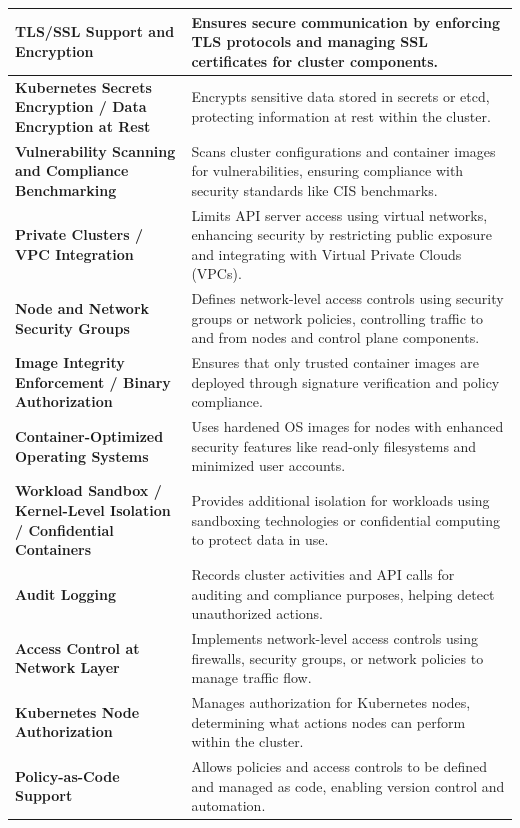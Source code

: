 \begin{longtable}{p{0.35\linewidth} p{0.65\linewidth}}
\hline
\textbf{TLS/SSL Support and Encryption} & Ensures secure communication by enforcing TLS protocols and managing SSL certificates for cluster components. \\
\hline
\textbf{Kubernetes Secrets Encryption / Data Encryption at Rest} & Encrypts sensitive data stored in secrets or etcd, protecting information at rest within the cluster. \\
\hline
\textbf{Vulnerability Scanning and Compliance Benchmarking} & Scans cluster configurations and container images for vulnerabilities, ensuring compliance with security standards like CIS benchmarks. \\
\hline
\textbf{Private Clusters / VPC Integration} & Limits API server access using virtual networks, enhancing security by restricting public exposure and integrating with Virtual Private Clouds (VPCs). \\
\hline
\textbf{Node and Network Security Groups} & Defines network-level access controls using security groups or network policies, controlling traffic to and from nodes and control plane components. \\
\hline
\textbf{Image Integrity Enforcement / Binary Authorization} & Ensures that only trusted container images are deployed through signature verification and policy compliance. \\
\hline
\textbf{Container-Optimized Operating Systems} & Uses hardened OS images for nodes with enhanced security features like read-only filesystems and minimized user accounts. \\
\hline
\textbf{Workload Sandbox / Kernel-Level Isolation / Confidential Containers} & Provides additional isolation for workloads using sandboxing technologies or confidential computing to protect data in use. \\
\hline
\textbf{Audit Logging} & Records cluster activities and API calls for auditing and compliance purposes, helping detect unauthorized actions. \\
\hline
\textbf{Access Control at Network Layer} & Implements network-level access controls using firewalls, security groups, or network policies to manage traffic flow. \\
\hline
\textbf{Kubernetes Node Authorization} & Manages authorization for Kubernetes nodes, determining what actions nodes can perform within the cluster. \\
\hline
\textbf{Policy-as-Code Support} & Allows policies and access controls to be defined and managed as code, enabling version control and automation. \\

\end{longtable}
